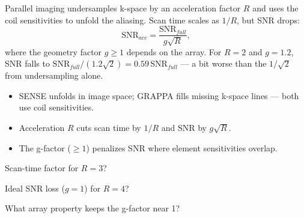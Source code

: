 \begin{workedexample}
Parallel imaging undersamples k-space by an acceleration factor $R$ and
uses the coil sensitivities to unfold the aliasing. Scan time scales as $1/R$, but
SNR drops:
\[ \text{SNR}_{acc} = \frac{\text{SNR}_{full}}{g\sqrt{R}}, \]
where the geometry factor $g \ge 1$ depends on the array. For $R = 2$ and
$g = 1.2$, SNR falls to $\text{SNR}_{full}/(1.2\sqrt{2}) = 0.59\,\text{SNR}_{full}$
--- a bit worse than the $1/\sqrt{2}$ from undersampling alone.
\end{workedexample}

\begin{keytakeaways}
\begin{itemize}[leftmargin=1.4em,itemsep=2pt]
\item SENSE unfolds in image space; GRAPPA fills missing k-space lines --- both use coil sensitivities.
\item Acceleration $R$ cuts scan time by $1/R$ and SNR by $g\sqrt{R}$.
\item The g-factor ($\ge 1$) penalizes SNR where element sensitivities overlap.
\end{itemize}
\end{keytakeaways}

\begin{exercises}
\item Scan-time factor for $R = 3$?
\item Ideal SNR loss ($g = 1$) for $R = 4$?
\item What array property keeps the g-factor near 1?
\end{exercises}

